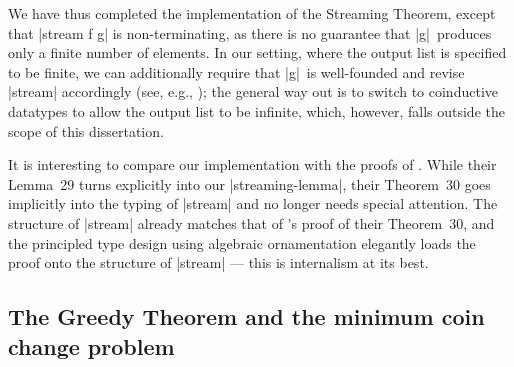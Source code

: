 We have thus completed the implementation of the Streaming Theorem, except that |stream f g| is non-terminating, as there is no guarantee that |g|~produces only a finite number of elements.
In our setting, where the output list is specified to be finite, we can additionally require that |g|~is well-founded and revise |stream| accordingly (see, e.g., \citet{Nordstrom-accessibility}); the general way out is to switch to coinductive datatypes to allow the output list to be infinite, which, however, falls outside the scope of this dissertation.

It is interesting to compare our implementation with the proofs of \citet{Bird-arithmetic-coding}.
While their Lemma~29 turns explicitly into our |streaming-lemma|, their Theorem~30 goes implicitly into the typing of |stream| and no longer needs special attention.
The structure of |stream| already matches that of \citeauthor{Bird-arithmetic-coding}'s proof of their Theorem~30, and the principled type design using algebraic ornamentation elegantly loads the proof onto the structure of |stream| --- this is internalism at its best.

\subsection{The Greedy Theorem and the minimum coin change problem}
\label{sec:minimum-coin-change}

